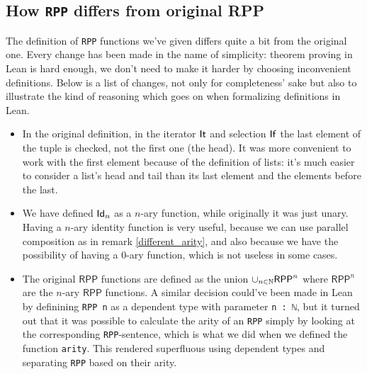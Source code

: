 \documentclass[runningheads]{llncs}
\newcommand{\RPP}{\textsf{RPP}\xspace}
\begin{document}
\subsection{How \lstinline|RPP| differs from original \RPP}
The definition of \lstinline{RPP} functions we've given differs quite a bit from the original one.
Every change has been made in the name of simplicity:
theorem proving in Lean is hard enough,
we don't need to make it harder by choosing inconvenient definitions.
Below is a list of changes, not only for completeness' sake but also to illustrate the kind of reasoning which goes on
when formalizing definitions in Lean.
\begin{itemize}
    \item In the original definition,
    in the iterator $\mathsf{It}$ and selection $\mathsf{If}$ the last element of the tuple is checked,
    not the first one (the head).
    It was more convenient to work with the first element because of the definition of lists:
    it's much easier to consider a list's head and tail than its last element and the elements before the last.
    \item We have defined $\mathsf{Id}_n$ as a $n$-ary function, while originally it was just unary.
    Having a $n$-ary identity function is very useful,
    because we can use parallel composition as in remark \ref{different_arity},
    and also because we have the possibility of having a $0$-ary function, which is not useless in some cases.
    \item The original $\RPP$ functions are defined as the union $\cup_{n \in \NN}\RPP^n$
    where $\RPP^n$ are the $n$-ary $\RPP$ functions.
    A similar decision could've been made in Lean by definining \lstinline{RPP n} as a dependent type
    with parameter \lstinline{n : ℕ},
    but it turned out that it was possible to calculate the arity of an \lstinline{RPP} simply by looking at
    the corresponding \lstinline{RPP}-sentence, which is what we did when we defined the function \lstinline{arity}.
    This rendered superfluous using dependent types and separating \lstinline{RPP} based on their arity.


\end{itemize}
\end{document}
